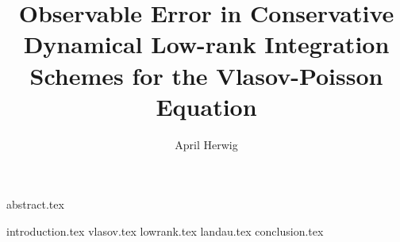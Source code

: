 \documentclass[a4paper]{article}
\title{
    Observable Error in Conservative 
    Dynamical Low-rank Integration Schemes 
    for the Vlasov-Poisson Equation
}
\author{April Herwig}
\begin{document}
\maketitle

{abstract.tex}

\tableofcontents

{introduction.tex}
{vlasov.tex}
{lowrank.tex}
{landau.tex}
{conclusion.tex}

\printbibliography
\end{document}
